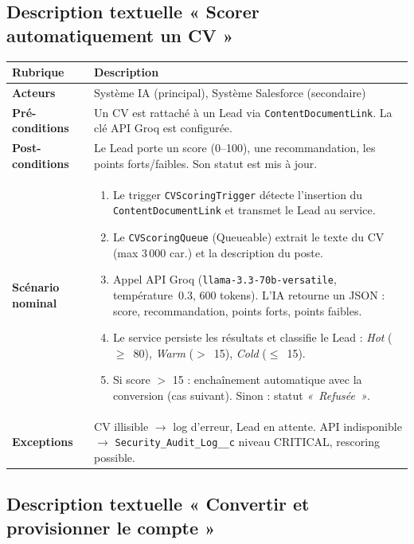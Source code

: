\subsection{Description textuelle « Scorer automatiquement un CV »}

\begin{longtable}{|p{4cm}|p{10.5cm}|}
\hline
\rowcolor{gray!15} \textbf{Rubrique} & \textbf{Description} \\
\hline
\endfirsthead
\endhead

\textbf{Acteurs} & Système IA (principal), Système Salesforce (secondaire) \\
\hline
\textbf{Pré-conditions} & Un CV est rattaché à un Lead via \texttt{ContentDocumentLink}. La clé API Groq est configurée. \\
\hline
\textbf{Post-conditions} & Le Lead porte un score (0--100), une recommandation, les points forts/faibles. Son statut est mis à jour. \\
\hline
\textbf{Scénario nominal} &
\begin{enumerate}[nosep,leftmargin=*]
    \item Le trigger \texttt{CVScoringTrigger} détecte l'insertion du \texttt{ContentDocumentLink} et transmet le Lead au service.
    \item Le \texttt{CVScoringQueue} (Queueable) extrait le texte du CV (max 3\,000 car.) et la description du poste.
    \item Appel API Groq (\texttt{llama-3.3-70b-versatile}, température~0.3, 600 tokens). L'IA retourne un JSON : score, recommandation, points forts, points faibles.
    \item Le service persiste les résultats et classifie le Lead : \textit{Hot} ($\geq$~80), \textit{Warm} ($>$~15), \textit{Cold} ($\leq$~15).
    \item Si score $>$ 15 : enchaînement automatique avec la conversion (cas suivant). Sinon : statut \textit{«~Refusée~»}.
\end{enumerate} \\
\hline
\textbf{Exceptions} & CV illisible $\rightarrow$ log d'erreur, Lead en attente. API indisponible $\rightarrow$ \texttt{Security\_Audit\_Log\_\_c} niveau CRITICAL, rescoring possible. \\
\hline
\end{longtable}
\FloatBarrier

\subsection{Description textuelle « Convertir et provisionner le compte »}

